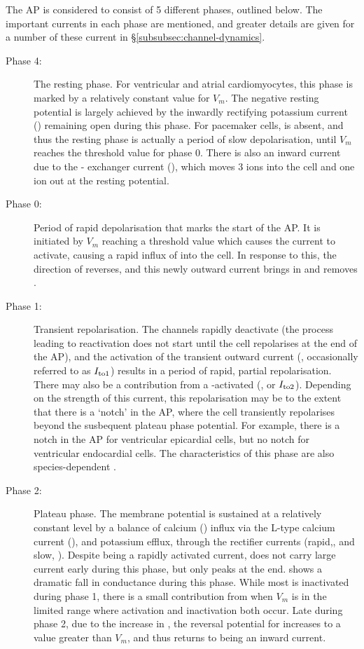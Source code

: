 \documentclass[../thesis-main.tex]{subfiles}
\begin{document}
The AP is considered to consist of 5 different phases, outlined below. The important currents in each phase are mentioned, and greater details are given for a number of these current in \S\ref{subsubsec:channel-dynamics}.
\begin{description}
 \item[Phase 4:] The resting phase. For ventricular and atrial cardiomyocytes, this phase is marked by a relatively constant value for $V_m$. The negative resting potential is largely achieved by the inwardly rectifying potassium current (\ikix{}) remaining open during this phase. For pacemaker cells, \ikix{} is absent, and thus the resting phase is actually a period of slow depolarisation, until $V_m$ reaches the threshold value for phase 0. There is also an inward current due to the \na{}-\ca{} exchanger current (\inaca), which moves 3 \na{} ions into the cell and one \ca{} ion out at the resting potential.
 \item[Phase 0:] Period of rapid depolarisation that marks the start of the AP. It is initiated by $V_m$ reaching a threshold value which causes the \ina{} current to activate, causing a rapid influx of \na{} into the cell. In response to this, the direction of \inaca{} reverses, and this newly outward current brings in \ca{} and removes \na{}.
 \item[Phase 1:] Transient repolarisation. The \na{} channels rapidly deactivate (the process leading to reactivation does not start until the cell repolarises at the end of the AP), and the activation of the transient \K{} outward current (\ito{}, occasionally referred to as $I_{\textnormal{to1}}$) results in a period of rapid, partial repolarisation. There may also be a contribution from a \ca{}-activated \cl (\icacl, or $I_{\textnormal{to2}}$). Depending on the strength of this current, this repolarisation may be to the extent that there is a `notch' in the AP, where the cell transiently repolarises beyond the susbequent plateau phase potential. For example, there is a notch in the AP for ventricular epicardial cells, but no notch for ventricular endocardial cells. The characteristics of this phase are also species-dependent \citep{Carmeliet2006}.
 \item[Phase 2:] Plateau phase. The membrane potential is sustained at a relatively constant level by a balance of calcium (\ca{}) influx via the L-type calcium current (\ica{}), and potassium efflux, through the rectifier \K{} currents (rapid,\ikr{}, and slow, \iks{}). Despite being a rapidly activated current, \ikr{} does not carry large current early during this phase, but only peaks at the end. \ikix{} shows a dramatic fall in conductance during this phase. While most \ina{} is inactivated during phase 1, there is a small contribution from \ina{} when $V_m$ is in the limited range where activation and inactivation both occur. Late during phase 2, due to the increase in \cai{}, the reversal potential for \inaca{} increases to a value greater than $V_m$, and thus \inaca{} returns to being an inward current.

\end{description}
\end{document}
